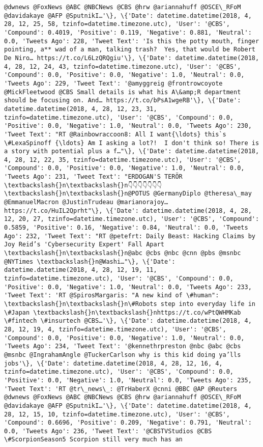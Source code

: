 \documentclass[11pt]{article}
\begin{document}
\begin{Verbatim}[commandchars=\\\{\}]
@dwnews @FoxNews @ABC @NBCNews @CBS @hrw @ariannahuff @OSCE\_RFoM @davidakaye @AFP @SputnikI…'\}, \{'Date': datetime.datetime(2018, 4, 28, 12, 25, 58, tzinfo=datetime.timezone.utc), 'User': '@CBS', 'Compound': 0.4019, 'Positive': 0.119, 'Negative': 0.881, 'Neutral': 0.0, 'Tweets Ago': 228, 'Tweet Text': 'Is this the potty mouth, finger pointing, a** wad of a man, talking trash?  Yes, that would be Robert De Niro… https://t.co/L6LzQRQgiu'\}, \{'Date': datetime.datetime(2018, 4, 28, 12, 24, 43, tzinfo=datetime.timezone.utc), 'User': '@CBS', 'Compound': 0.0, 'Positive': 0.0, 'Negative': 1.0, 'Neutral': 0.0, 'Tweets Ago': 229, 'Tweet Text': '@amyggreig @frontrowcoyote @MickFleetwood @CBS Small details is what his A\&amp;R department should be focusing on. And… https://t.co/bPsA1wgeRB'\}, \{'Date': datetime.datetime(2018, 4, 28, 12, 23, 31, tzinfo=datetime.timezone.utc), 'User': '@CBS', 'Compound': 0.0, 'Positive': 0.0, 'Negative': 1.0, 'Neutral': 0.0, 'Tweets Ago': 230, 'Tweet Text': "RT @Rainbowraccoon8: All I want{\ldots} this`s \#LexaSpinoff {\ldots} Am I asking a lot?!  I don't think so! There is a story with potential plus a f…"\}, \{'Date': datetime.datetime(2018, 4, 28, 12, 22, 35, tzinfo=datetime.timezone.utc), 'User': '@CBS', 'Compound': 0.0, 'Positive': 0.0, 'Negative': 1.0, 'Neutral': 0.0, 'Tweets Ago': 231, 'Tweet Text': "ERDOGAN'S TERÖR \textbackslash{}n\textbackslash{}n👇👇👇👇👇👇👇\textbackslash{}n\textbackslash{}n@POTUS @GermanyDiplo @theresa\_may @EmmanuelMacron @JustinTrudeau @marianorajoy… https://t.co/HuIL2Qprht"\}, \{'Date': datetime.datetime(2018, 4, 28, 12, 20, 27, tzinfo=datetime.timezone.utc), 'User': '@CBS', 'Compound': 0.5859, 'Positive': 0.16, 'Negative': 0.84, 'Neutral': 0.0, 'Tweets Ago': 232, 'Tweet Text': "RT @petefrt: Daily Beast: Hacking Claims by Joy Reid’s 'Cybersecurity Expert' Fall Apart \textbackslash{}n\textbackslash{}n@abc @cbs @nbc @cnn @pbs @msnbc @NYTimes \textbackslash{}n@Washi…"\}, \{'Date': datetime.datetime(2018, 4, 28, 12, 19, 11, tzinfo=datetime.timezone.utc), 'User': '@CBS', 'Compound': 0.0, 'Positive': 0.0, 'Negative': 1.0, 'Neutral': 0.0, 'Tweets Ago': 233, 'Tweet Text': 'RT @SpirosMargaris: "A new kind of \#human": \textbackslash{}n\textbackslash{}n\#Robots step into everyday life in \#Japan \textbackslash{}n\textbackslash{}nhttps://t.co/wPtQWHMKab \#fintech \#insurtech @CBS…'\}, \{'Date': datetime.datetime(2018, 4, 28, 12, 19, 4, tzinfo=datetime.timezone.utc), 'User': '@CBS', 'Compound': 0.0, 'Positive': 0.0, 'Negative': 1.0, 'Neutral': 0.0, 'Tweets Ago': 234, 'Tweet Text': '@kennethrpreston @nbc @abc @cbs @msnbc @IngrahamAngle @TuckerCarlson why is this kid doing ya’lls jobs'\}, \{'Date': datetime.datetime(2018, 4, 28, 12, 16, 4, tzinfo=datetime.timezone.utc), 'User': '@CBS', 'Compound': 0.0, 'Positive': 0.0, 'Negative': 1.0, 'Neutral': 0.0, 'Tweets Ago': 235, 'Tweet Text': 'RT @tr\_news\_: @TrHaberX @cnni @BBC @AP @Reuters @dwnews @FoxNews @ABC @NBCNews @CBS @hrw @ariannahuff @OSCE\_RFoM @davidakaye @AFP @SputnikI…'\}, \{'Date': datetime.datetime(2018, 4, 28, 12, 15, 10, tzinfo=datetime.timezone.utc), 'User': '@CBS', 'Compound': 0.6696, 'Positive': 0.209, 'Negative': 0.791, 'Neutral': 0.0, 'Tweets Ago': 236, 'Tweet Text': '@CBSTVStudios @CBS \#ScorpionSeason5 Scorpion still very much has an 
\end{Verbatim}
\end{document}
